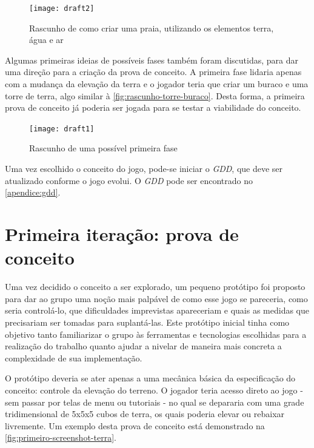 \begin{figure}[htb]
	\centering
	\caption{Rascunho de como criar uma praia, utilizando os elementos terra, água e ar}
	\texttt{[image: draft2]}
	\legend{\fonteAP}
	\label{fig:rascunhos-praia}
\end{figure}

Algumas primeiras ideias de possíveis fases também foram discutidas, para 
dar uma direção para a criação da prova de conceito. A primeira fase lidaria 
apenas com a mudança da elevação da terra e o jogador teria que criar um 
buraco e uma torre de terra, algo similar à \autoref{fig:rascunho-torre-buraco}.
Desta forma, a primeira prova de conceito já poderia ser jogada 
para se testar a viabilidade do conceito.

\begin{figure}[ht]
	\centering
	\caption{Rascunho de uma possível primeira fase}
	\texttt{[image: draft1]}
	\legend{\fonteAP}
	\label{fig:rascunho-torre-buraco}
\end{figure}

Uma vez escolhido o conceito do jogo, pode-se iniciar o 
\textit{GDD}, que deve ser atualizado conforme o jogo 
evolui. O \textit{GDD} pode ser encontrado no \autoref{apendice:gdd}.

\section{Primeira iteração: prova de conceito}\label{sec-primeira-iteracao-prova-conceito}

Uma vez decidido o conceito a ser explorado, um pequeno protótipo foi proposto 
para dar ao grupo uma noção mais palpável de como esse jogo se pareceria, como 
seria controlá-lo, que dificuldades imprevistas apareceriam e quais as medidas 
que precisariam ser tomadas para suplantá-las. Este protótipo inicial tinha 
como objetivo tanto familiarizar o grupo às ferramentas e tecnologias 
escolhidas para a realização do trabalho quanto ajudar a nivelar de maneira 
mais concreta a complexidade de sua implementação.

O protótipo deveria se ater apenas a uma mecânica básica da especificação 
do conceito: controle da elevação do terreno. O jogador teria acesso direto ao 
jogo - sem passar por telas de menu ou tutoriais - no qual se depararia com 
uma grade tridimensional de 5x5x5 cubos de terra, os quais poderia elevar 
ou rebaixar livremente. Um exemplo desta prova de conceito está 
demonstrado na \autoref{fig:primeiro-screenshot-terra}.

